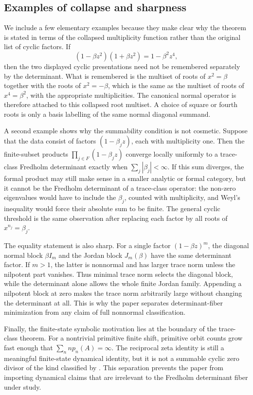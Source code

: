\subsection{Examples of collapse and sharpness}

We include a few elementary examples because they make clear why the theorem is
stated in terms of the collapsed multiplicity function rather than the original
list of cyclic factors.  If
\[
  (1-\beta z^2)(1+\beta z^2)=1-\beta^2z^4,
\]
then the two displayed cyclic presentations need not be remembered separately
by the determinant.  What is remembered is the multiset of roots of
\(x^2=\beta\) together with the roots of \(x^2=-\beta\), which is the same as
the multiset of roots of \(x^4=\beta^2\), with the appropriate multiplicities.
The canonical normal operator is therefore attached to this collapsed root
multiset.  A choice of square or fourth roots is only a basis labelling of the
same normal diagonal summand.

A second example shows why the summability condition is not cosmetic.  Suppose
that the data consist of factors \((1-\beta_jz)\), each with multiplicity one.
Then the finite-subset products \(\prod_{j\in F}(1-\beta_jz)\) converge locally
uniformly to a trace-class Fredholm determinant exactly when
\(\sum_j|\beta_j|<\infty\).  If this sum diverges, the formal product may still
make sense in a smaller analytic or formal category, but it cannot be the
Fredholm determinant of a trace-class operator: the non-zero eigenvalues would
have to include the \(\beta_j\), counted with multiplicity, and Weyl's
inequality would force their absolute sum to be finite.  The general cyclic
threshold is the same observation after replacing each factor by all roots of
\(x^{n_j}=\beta_j\).

The equality statement is also sharp.  For a single factor
\((1-\beta z)^m\), the diagonal normal block \(\beta I_m\) and the Jordan block
\(J_m(\beta)\) have the same determinant factor.  If \(m>1\), the latter is
nonnormal and has larger trace norm unless the nilpotent part vanishes.  Thus
minimal trace norm selects the diagonal block, while the determinant alone
allows the whole finite Jordan family.  Appending a nilpotent block at zero
makes the trace norm arbitrarily large without changing the determinant at all.
This is why the paper separates determinant-fiber minimization from any claim
of full nonnormal classification.

Finally, the finite-state symbolic motivation lies at the boundary of the
trace-class theorem.  For a nontrivial primitive finite shift, primitive orbit
counts grow fast enough that \(\sum_n n p_n(A)=\infty\).  The reciprocal zeta
identity is still a meaningful finite-state dynamical identity, but it is not a
summable cyclic zero divisor of the kind classified by
.  This separation prevents the paper
from importing dynamical claims that are irrelevant to the Fredholm determinant
fiber under study.

